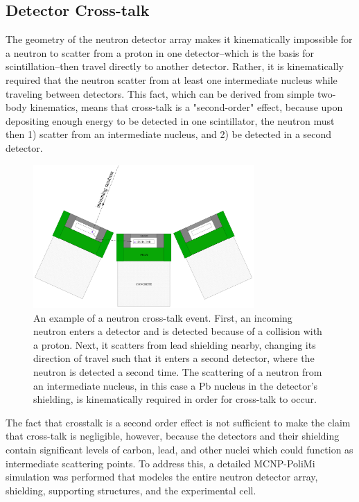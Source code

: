 \subsection{Detector Cross-talk}
The geometry of the neutron detector array makes it kinematically impossible for a neutron to scatter from a proton in one detector--which is the basis for scintillation--then travel directly to another detector.
Rather, it is kinematically required that the neutron scatter from at least one intermediate nucleus while traveling between detectors.
This fact, which can be derived from simple two-body kinematics, means that cross-talk is a "second-order" effect, because upon depositing enough energy to be detected in one scintillator, the neutron must then 1) scatter from an intermediate nucleus, and 2) be detected in a second detector.
\begin{figure}
    \centering
    \includegraphics[width = 0.75\textwidth]{Content/Methods/CrossTalkExample.png}
    \caption{An example of a neutron cross-talk event.
First, an incoming neutron enters a detector and is detected because of a collision with a proton.
Next, it scatters from lead shielding nearby, changing its direction of travel such that it enters a second detector, where the neutron is detected a second time.
The scattering of a neutron from an intermediate nucleus, in this case a Pb nucleus in the detector's shielding, is kinematically required in order for cross-talk to occur.}
    \label{fig:CrossTalkExamplepng}
\end{figure}
The fact that crosstalk is a second order effect is not sufficient to make the claim that cross-talk is negligible, however,
because the detectors and their shielding contain significant levels of carbon, lead, and other nuclei which could function as intermediate scattering points.
To address this, a detailed MCNP-PoliMi simulation was performed that modeles the entire neutron detector array, shielding, supporting structures, and the experimental cell.
